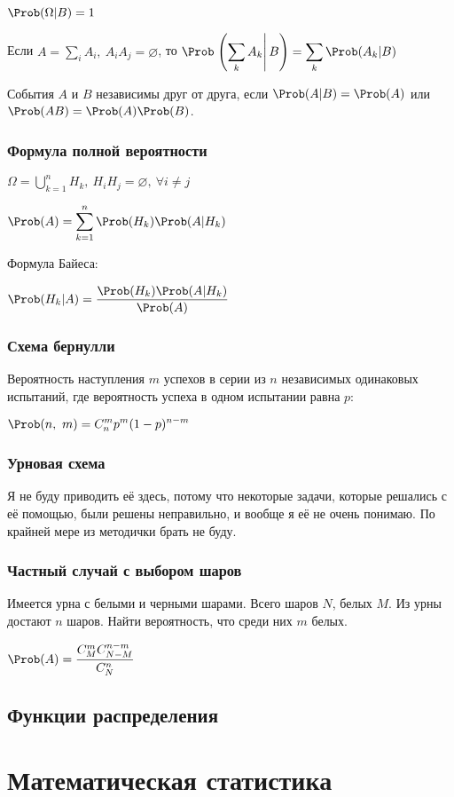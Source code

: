 $\displaystyle \Prob(\Omega|B) = 1 $

Если $\displaystyle A = \sum_{i} A_i,\ A_i A_j = \varnothing $, то $\displaystyle \Prob\left.\left(\sum_k A_k\right|B\right) = \sum_k \Prob(A_k|B) $

События $A$ и $B$ независимы друг от друга, если $\Prob(A|B) = \Prob(A)$ или $\Prob(AB) = \Prob(A)\Prob(B)$.

\subsubsection{Формула полной вероятности}

$\displaystyle \Omega = \bigcup_{k=1}^n H_k,\ H_i H_j = \varnothing,\ \forall i \neq j $

$\displaystyle \Prob(A) = \sum_{k=1}^{n} \Prob(H_k) \Prob(A|H_k) $

Формула Байеса:

$\displaystyle \Prob(H_k|A) = \frac{\Prob(H_k)\Prob(A|H_k)}{\Prob(A)} $

\subsubsection{Схема бернулли}

Вероятность наступления $m$ успехов в серии из $n$ независимых одинаковых испытаний, где вероятность успеха в одном испытании равна $p$:

$\displaystyle \Prob(n,\ m) = C_n^m p^m (1-p)^{n-m} $

\subsubsection{Урновая схема}

Я не буду приводить её здесь, потому что некоторые задачи, которые решались с её помощью, были решены неправильно, и вообще я её не очень понимаю. По крайней мере из методички брать не буду.

\subsubsection{Частный случай с выбором шаров}

Имеется урна с белыми и черными шарами. Всего шаров $N$, белых $M$. Из урны достают $n$ шаров. Найти вероятность, что среди них $m$ белых.

$\displaystyle \Prob(A) = \frac{C_M^m C_{N-M}^{n-m}}{C_N^n} $

\subsection{Функции распределения}

\section{Математическая статистика}